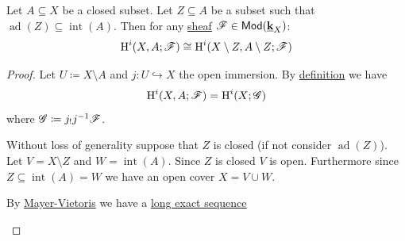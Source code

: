 \documentclass[../../main]{subfiles}
\begin{document}
\begin{theorem}[Excision]\label{thm:excision-axiom}
  Let \(A \subseteq X\) be a closed subset.
  Let \(Z \subseteq A\) be a subset such that \(\operatorname{ad}(Z) \subseteq \operatorname{int}(A)\).
  Then for any \hyperref[def:sheaf]{sheaf} \(\mathscr{F} \in \mathsf{Mod}(\underline{\mathbf{k}}_{X})\):
  \begin{equation*}
    \operatorname{H}^{i}(X, A; \mathscr{F}) \cong \operatorname{H}^{i}(X \setminus Z, A \setminus Z; \mathscr{F})
  \end{equation*}
\end{theorem}
\begin{proof}
  Let \(U \coloneq X \setminus A\) and \(j\colon U \hookrightarrow X\) the open immersion.
  By \hyperref[def:relative-sheaf-cohomology]{definition} we have
  \begin{equation*}
    \operatorname{H}^{i}(X, A; \mathscr{F}) = \operatorname{H}^{i}(X; \mathscr{G})
  \end{equation*}
  where \(\mathscr{G} \coloneq j_{!}j^{-1}\mathscr{F}\).

  Without loss of generality suppose that \(Z\) is closed (if not consider \(\operatorname{ad}(Z)\)).
  Let \(V = X \setminus Z\) and \(W = \operatorname{int}(A)\).
  Since \(Z\) is closed \(V\) is open. Furthermore since \(Z \subseteq \operatorname{int}(A) = W\) we have an open cover \(X = V \cup W\).

  By \hyperref[thm:mayer-vietoris-open]{Mayer-Vietoris} we have a \hyperref[def:exact-sequence]{long exact sequence}
  \begin{center}
  \end{center}


\end{proof}
\end{document}
